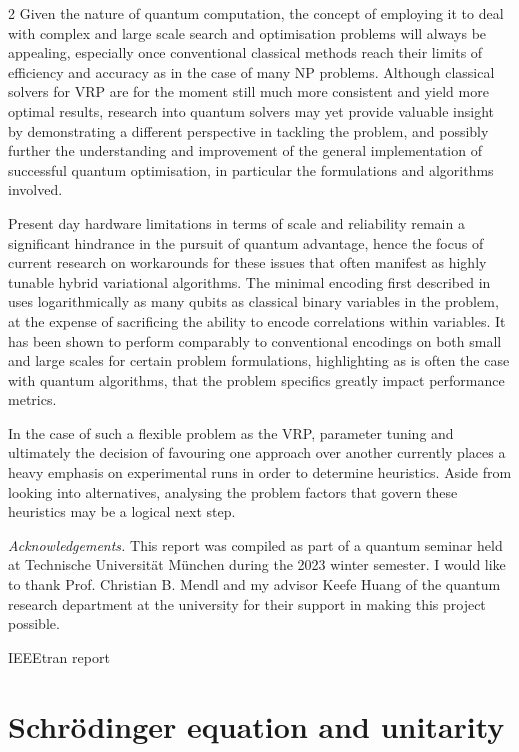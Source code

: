 \documentclass [10pt]{article}
\begin{document}
\begin {multicols}{2}
Given the nature of quantum computation, the concept of employing it to deal
with complex and large scale search and optimisation problems will always be
appealing, especially once conventional classical methods reach their limits
of efficiency and accuracy as in the case of many NP problems. Although
classical solvers for VRP are for the moment still much more consistent and
yield more optimal results, research into quantum solvers may
yet provide valuable insight by demonstrating a different perspective in
tackling the problem, and possibly further the understanding and improvement
of the general implementation of successful quantum optimisation, in
particular the formulations and algorithms involved.

Present day hardware limitations in terms of scale and reliability remain a
significant hindrance in the pursuit of quantum advantage, hence the focus
of current research on workarounds for these issues that often manifest as 
highly tunable hybrid variational algorithms. The minimal encoding first
described in \cite{effbinopt} uses logarithmically as many qubits as classical
binary variables in the problem, at the expense of sacrificing the ability to
encode correlations within variables. It has been shown \cite{effvrp} to perform
comparably to conventional encodings on both small and large scales for certain
problem formulations, highlighting as is often the case with quantum algorithms,
that the problem specifics greatly impact performance metrics.

In the case of such a flexible problem as the VRP, parameter tuning and
ultimately the decision of favouring one approach over another currently places
a heavy emphasis on experimental runs in order to determine heuristics. Aside
from looking into alternatives, analysing the problem factors that govern these
heuristics may be a logical next step.


\textit{Acknowledgements.}
This report was compiled as part of a quantum seminar held
at Technische Universität München during the 2023 winter semester. I would
like to thank Prof. Christian B. Mendl and my advisor Keefe Huang of the 
quantum research department at the university for their support in making
this project possible.

 {IEEEtran}
 {report}

\appendix

\section {Schrödinger equation and unitarity}
\label {schrodinger}


\end{multicols}
\end{document}
